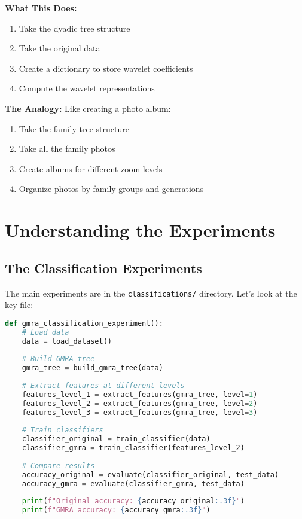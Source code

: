 \documentclass[12pt]{article}
\begin{document}
\textbf{What This Does:}
\begin{enumerate}
    \item Take the dyadic tree structure
    \item Take the original data
    \item Create a dictionary to store wavelet coefficients
    \item Compute the wavelet representations
\end{enumerate}

\textbf{The Analogy:} Like creating a photo album:
\begin{enumerate}
    \item Take the family tree structure
    \item Take all the family photos
    \item Create albums for different zoom levels
    \item Organize photos by family groups and generations
\end{enumerate}

\section{Understanding the Experiments}

\subsection{The Classification Experiments}

The main experiments are in the \texttt{classifications/} directory. Let's look at the key file:

\begin{lstlisting}[language=Python, basicstyle=\small]
def gmra_classification_experiment():
    # Load data
    data = load_dataset()
    
    # Build GMRA tree
    gmra_tree = build_gmra_tree(data)
    
    # Extract features at different levels
    features_level_1 = extract_features(gmra_tree, level=1)
    features_level_2 = extract_features(gmra_tree, level=2)
    features_level_3 = extract_features(gmra_tree, level=3)
    
    # Train classifiers
    classifier_original = train_classifier(data)
    classifier_gmra = train_classifier(features_level_2)
    
    # Compare results
    accuracy_original = evaluate(classifier_original, test_data)
    accuracy_gmra = evaluate(classifier_gmra, test_data)
    
    print(f"Original accuracy: {accuracy_original:.3f}")
    print(f"GMRA accuracy: {accuracy_gmra:.3f}")
\end{lstlisting}
\end{document}
